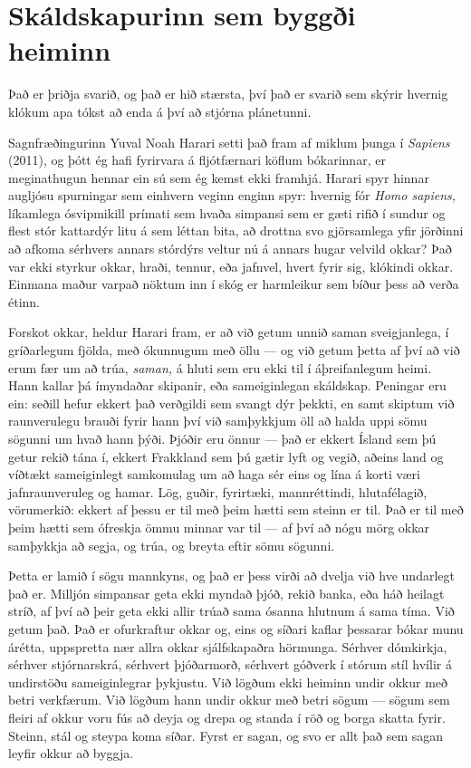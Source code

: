 \section*{Skáldskapurinn sem byggði heiminn}

Það er þriðja svarið, og það er hið stærsta, því það er svarið sem skýrir hvernig klókum apa tókst að enda á því að stjórna plánetunni.

Sagnfræðingurinn Yuval Noah Harari setti það fram af miklum þunga í \emph{Sapiens} (2011), og þótt ég hafi fyrirvara á fljótfærnari köflum bókarinnar, er meginathugun hennar ein sú sem ég kemst ekki framhjá. Harari spyr hinnar augljósu spurningar sem einhvern veginn enginn spyr: hvernig fór \emph{Homo sapiens,} líkamlega ósvipmikill prímati sem hvaða simpansi sem er gæti rifið í sundur og flest stór kattardýr litu á sem léttan bita, að drottna svo gjörsamlega yfir jörðinni að afkoma sérhvers annars stórdýrs veltur nú á annars hugar velvild okkar? Það var ekki styrkur okkar, hraði, tennur, eða jafnvel, hvert fyrir sig, klókindi okkar. Einmana maður varpað nöktum inn í skóg er harmleikur sem bíður þess að verða étinn.

Forskot okkar, heldur Harari fram, er að við getum unnið saman sveigjanlega, í gríðarlegum fjölda, með ókunnugum með öllu — og við getum þetta af því að við erum fær um að trúa, \emph{saman,} á hluti sem eru ekki til í áþreifanlegum heimi. Hann kallar þá ímyndaðar skipanir, eða sameiginlegan skáldskap. Peningar eru ein: seðill hefur ekkert það verðgildi sem svangt dýr þekkti, en samt skiptum við raunverulegu brauði fyrir hann því við samþykkjum öll að halda uppi sömu sögunni um hvað hann þýði. Þjóðir eru önnur — það er ekkert Ísland sem þú getur rekið tána í, ekkert Frakkland sem þú gætir lyft og vegið, aðeins land og víðtækt sameiginlegt samkomulag um að haga sér eins og lína á korti væri jafnraunveruleg og hamar. Lög, guðir, fyrirtæki, mannréttindi, hlutafélagið, vörumerkið: ekkert af þessu er til með þeim hætti sem steinn er til. Það er til með þeim hætti sem ófreskja ömmu minnar var til — af því að nógu mörg okkar samþykkja að segja, og trúa, og breyta eftir sömu sögunni.

Þetta er lamið í sögu mannkyns, og það er þess virði að dvelja við hve undarlegt það er. Milljón simpansar geta ekki myndað þjóð, rekið banka, eða háð heilagt stríð, af því að þeir geta ekki allir trúað sama ósanna hlutnum á sama tíma. Við getum það. Það er ofurkraftur okkar og, eins og síðari kaflar þessarar bókar munu árétta, uppspretta nær allra okkar sjálfskapaðra hörmunga. Sérhver dómkirkja, sérhver stjórnarskrá, sérhvert þjóðarmorð, sérhvert góðverk í stórum stíl hvílir á undirstöðu sameiginlegrar þykjustu. Við lögðum ekki heiminn undir okkur með betri verkfærum. Við lögðum hann undir okkur með betri sögum — sögum sem fleiri af okkur voru fús að deyja og drepa og standa í röð og borga skatta fyrir. Steinn, stál og steypa koma síðar. Fyrst er sagan, og svo er allt það sem sagan leyfir okkur að byggja.

